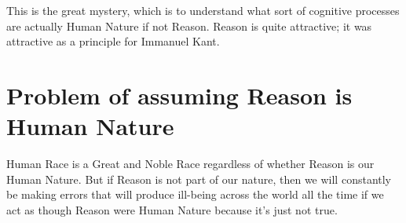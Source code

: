 \documentclass{amsart}
\begin{document}
This is the great mystery, which is to understand what sort of cognitive processes are actually Human Nature if not Reason.  Reason is quite attractive; it was attractive as a principle for Immanuel Kant.  

\section{Problem of assuming Reason is Human Nature}

Human Race is a Great and Noble Race regardless of whether Reason is our Human Nature.  But if Reason is not part of our nature, then we will constantly be making errors that will produce ill-being across the world all the time if we act as though Reason were Human Nature because it's just not true.

 
\end{document}
